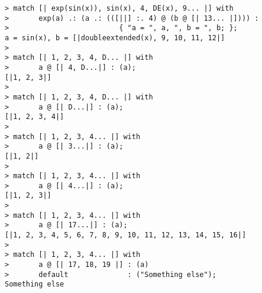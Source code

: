 \begin{center}\begin{minipage}{15cm}\begin{Verbatim}[frame=single]
> match [| exp(sin(x)), sin(x), 4, DE(x), 9... |] with
>       exp(a) .: (a .: (([||] :. 4) @ (b @ [| 13... |]))) : 
>                          { "a = ", a, ", b = ", b; };
a = sin(x), b = [|doubleextended(x), 9, 10, 11, 12|]
> 
> match [| 1, 2, 3, 4, D... |] with 
>       a @ [| 4, D...|] : (a);
[|1, 2, 3|]
> 
> match [| 1, 2, 3, 4, D... |] with 
>       a @ [| D...|] : (a);
[|1, 2, 3, 4|]
> 
> match [| 1, 2, 3, 4... |] with 
>       a @ [| 3...|] : (a);
[|1, 2|]
> 
> match [| 1, 2, 3, 4... |] with 
>       a @ [| 4...|] : (a);
[|1, 2, 3|]
> 
> match [| 1, 2, 3, 4... |] with 
>       a @ [| 17...|] : (a);
[|1, 2, 3, 4, 5, 6, 7, 8, 9, 10, 11, 12, 13, 14, 15, 16|]
> 
> match [| 1, 2, 3, 4... |] with 
>       a @ [| 17, 18, 19 |] : (a)
>       default              : ("Something else");
Something else
\end{Verbatim}
\end{minipage}\end{center}
